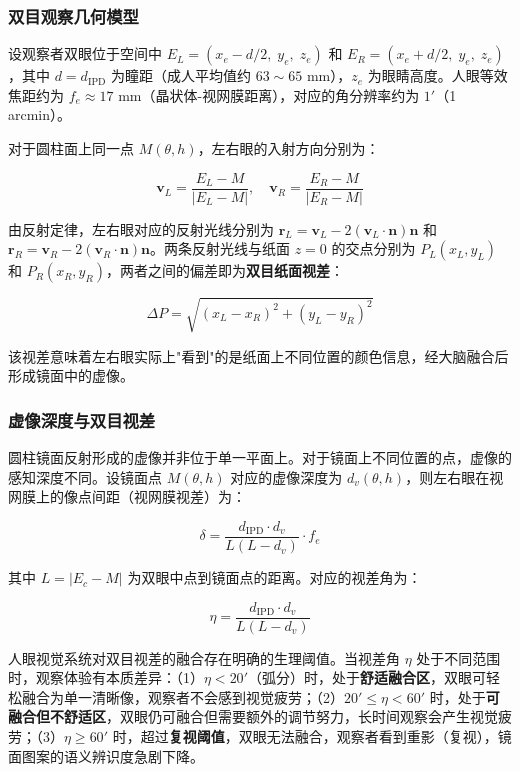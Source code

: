 \subsubsection{双目观察几何模型}

设观察者双眼位于空间中 $E_L = (x_e - d/2,\; y_e,\; z_e)$ 和 $E_R = (x_e + d/2,\; y_e,\; z_e)$，其中 $d = d_{\text{IPD}}$ 为瞳距（成人平均值约 $63\sim65$ mm），$z_e$ 为眼睛高度。人眼等效焦距约为 $f_e \approx 17$ mm（晶状体-视网膜距离），对应的角分辨率约为 $1'$（1 arcmin）。

对于圆柱面上同一点 $M(\theta, h)$，左右眼的入射方向分别为：

$$
\boldsymbol{v}_L = \frac{E_L - M}{|E_L - M|}, \quad \boldsymbol{v}_R = \frac{E_R - M}{|E_R - M|}
$$

由反射定律，左右眼对应的反射光线分别为 $\boldsymbol{r}_L = \boldsymbol{v}_L - 2(\boldsymbol{v}_L \cdot \boldsymbol{n})\boldsymbol{n}$ 和 $\boldsymbol{r}_R = \boldsymbol{v}_R - 2(\boldsymbol{v}_R \cdot \boldsymbol{n})\boldsymbol{n}$。两条反射光线与纸面 $z=0$ 的交点分别为 $P_L(x_L, y_L)$ 和 $P_R(x_R, y_R)$，两者之间的偏差即为\textbf{双目纸面视差}：

$$
\Delta P = \sqrt{(x_L - x_R)^2 + (y_L - y_R)^2}
$$

该视差意味着左右眼实际上"看到"的是纸面上不同位置的颜色信息，经大脑融合后形成镜面中的虚像。

\subsubsection{虚像深度与双目视差}

圆柱镜面反射形成的虚像并非位于单一平面上。对于镜面上不同位置的点，虚像的感知深度不同。设镜面点 $M(\theta, h)$ 对应的虚像深度为 $d_v(\theta, h)$，则左右眼在视网膜上的像点间距（视网膜视差）为：

$$
\delta = \frac{d_{\text{IPD}} \cdot d_v}{L(L - d_v)} \cdot f_e
$$

其中 $L = |E_c - M|$ 为双眼中点到镜面点的距离。对应的视差角为：

$$
\eta = \frac{d_{\text{IPD}} \cdot d_v}{L(L - d_v)}
$$

人眼视觉系统对双目视差的融合存在明确的生理阈值。当视差角 $\eta$ 处于不同范围时，观察体验有本质差异：（1）$\eta < 20'$（弧分）时，处于\textbf{舒适融合区}，双眼可轻松融合为单一清晰像，观察者不会感到视觉疲劳；（2）$20' \leq \eta < 60'$ 时，处于\textbf{可融合但不舒适区}，双眼仍可融合但需要额外的调节努力，长时间观察会产生视觉疲劳；（3）$\eta \geq 60'$ 时，超过\textbf{复视阈值}，双眼无法融合，观察者看到重影（复视），镜面图案的语义辨识度急剧下降。

